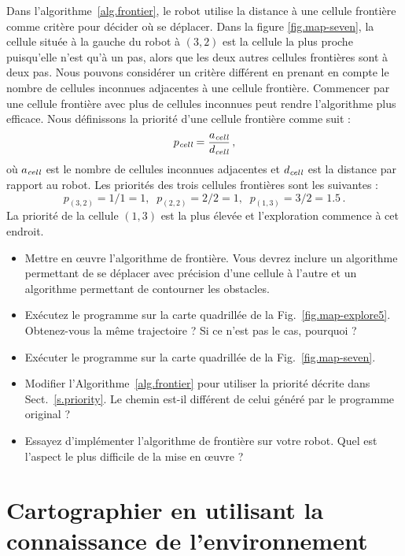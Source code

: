 Dans l'algorithme~\ref{alg.frontier}, le robot utilise la distance à une cellule frontière comme critère pour décider où se déplacer. Dans la figure \ref{fig.map-seven}, la cellule située à la gauche du robot à $(3,2)$ est la cellule la plus proche puisqu'elle n'est qu'à un pas, alors que les deux autres cellules frontières sont à deux pas. Nous pouvons considérer un critère différent en prenant en compte le nombre de cellules inconnues adjacentes à une cellule frontière. Commencer par une cellule frontière avec plus de cellules inconnues peut rendre l'algorithme plus efficace. Nous définissons la priorité d'une cellule frontière comme suit :
\[
p_{\textit{\scriptsize cell}} = \frac{a_{\textit{\scriptsize cell}}}{d_{\textit{\scriptsize cell}}}\,,
\]
où $a_{\textit{\scriptsize cell}}$ est le nombre de cellules inconnues adjacentes et $d_{\textit{\scriptsize cell}}$ est la distance par rapport au robot. Les priorités des trois cellules frontières sont les suivantes :
\[
p_{(3,2)} = 1/1 = 1,\;\;p_{(2,2)} = 2/2 = 1,\;\;p_{(1,3)} = 3/2 = 1.5\,.
\]
La priorité de la cellule $(1,3)$ est la plus élevée et l'exploration commence à cet endroit.

\begin{framed}
\begin{itemize}
\item Mettre en œuvre l'algorithme de frontière. Vous devrez inclure un algorithme permettant de se déplacer avec précision d'une cellule à l'autre et un algorithme permettant de contourner les obstacles.
\item Exécutez le programme sur la carte quadrillée de la Fig.~\ref{fig.map-explore5}. Obtenez-vous la même trajectoire ? Si ce n'est pas le cas, pourquoi ?
\item Exécuter le programme sur la carte quadrillée de la Fig.~\ref{fig.map-seven}.
\item Modifier l'Algorithme~\ref{alg.frontier} pour utiliser la priorité décrite dans Sect.~\ref{s.priority}. Le chemin est-il différent de celui généré par le programme original ?
\item Essayez d'implémenter l'algorithme de frontière sur votre robot. Quel est l'aspect le plus difficile de la mise en œuvre ?
\end{itemize}
\end{framed}

\section[La connaissance de l'environnement]{Cartographier en utilisant la connaissance de l'environnement}\label{s.map-update}

